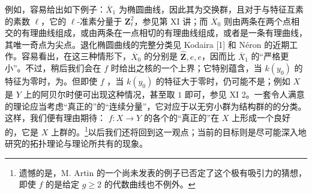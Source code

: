 例如，容易给出如下例子：$\overline X_1$ 为椭圆曲线，因此其为交换群，且对于与特征互素的素数 $\ell$，它的 $\ell$-准素分量于 $\mathbf Z_\ell^2$，参见第 XI 讲；而 $\overline X_0$ 则由两条在两个点相交的有理曲线组成，或由两条在一点相切的有理曲线组成，或者是一条有理曲线，其唯一奇点为尖点。退化椭圆曲线的完整分类见 Kodaira [1] 和 Néron 的近期工作。容易看出，在这三种情形下，$\overline X_0$ 的分别是 $\widehat{\mathbf Z},e,e$，因而比 $\overline X_1$ 的“严格更小”。不过，稍后我们会在 $f$ 时给出之核的一个上界；它特别蕴含，当 $k(y_0)$ 的特征为零时，为。但即使 $f$ ，当 $k(y_0)$ 的特征大于零时，仍可能不是；例如 $X$ 是 $Y$ 上的阿贝尔时便可出现这种情况，甚至取 $1$ 即可，参见 XI 2。一套令人满意的理论应当考虑“真正的”的“连续分量”，它对应于以无穷小群为结构群的的分类。这样，我们便有理由期待： $f:X\to Y$ 的各个的“真正的”在 $X$ 上形成一个良好的，它是 $X$ 上群的。\footnote{遗憾的是，M. Artin 的一个尚未发表的例子已否定了这个极有吸引力的猜想，即使 $f$ 的是给定 $g\geq2$ 的代数曲线也不例外。}以后我们还将回到这一观点；当前的目标则是尽可能深入地研究的拓扑理论与理论所共有的现象。

